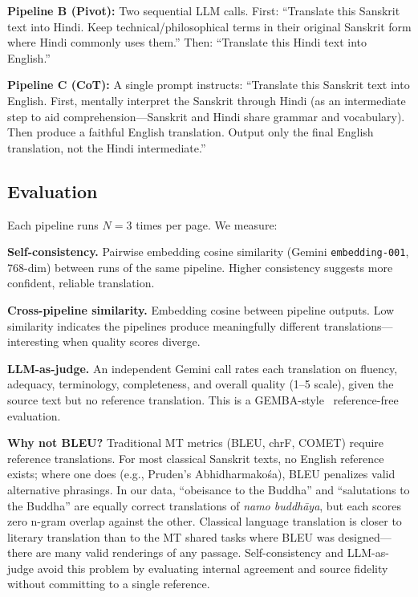 \documentclass[10pt,twocolumn]{article}
\begin{document}
\textbf{Pipeline B (Pivot):} Two sequential LLM calls. First: ``Translate this Sanskrit text into Hindi. Keep technical/philosophical terms in their original Sanskrit form where Hindi commonly uses them.'' Then: ``Translate this Hindi text into English.''

\textbf{Pipeline C (CoT):} A single prompt instructs: ``Translate this Sanskrit text into English. First, mentally interpret the Sanskrit through Hindi (as an intermediate step to aid comprehension---Sanskrit and Hindi share grammar and vocabulary). Then produce a faithful English translation. Output only the final English translation, not the Hindi intermediate.''

\subsection{Evaluation}

Each pipeline runs $N{=}3$ times per page. We measure:

\textbf{Self-consistency.} Pairwise embedding cosine similarity (Gemini \texttt{embedding-001}, 768-dim) between runs of the same pipeline. Higher consistency suggests more confident, reliable translation.

\textbf{Cross-pipeline similarity.} Embedding cosine between pipeline outputs. Low similarity indicates the pipelines produce meaningfully different translations---interesting when quality scores diverge.

\textbf{LLM-as-judge.} An independent Gemini call rates each translation on fluency, adequacy, terminology, completeness, and overall quality (1--5 scale), given the source text but no reference translation. This is a GEMBA-style~\cite{kocmi2023} reference-free evaluation.

\textbf{Why not BLEU?} Traditional MT metrics (BLEU, chrF, COMET) require reference translations. For most classical Sanskrit texts, no English reference exists; where one does (e.g., Pruden's Abhidharmako\'sa), BLEU penalizes valid alternative phrasings. In our data, ``obeisance to the Buddha'' and ``salutations to the Buddha'' are equally correct translations of \emph{namo buddh\=aya}, but each scores zero n-gram overlap against the other. Classical language translation is closer to literary translation than to the MT shared tasks where BLEU was designed---there are many valid renderings of any passage. Self-consistency and LLM-as-judge avoid this problem by evaluating internal agreement and source fidelity without committing to a single reference.
\end{document}
